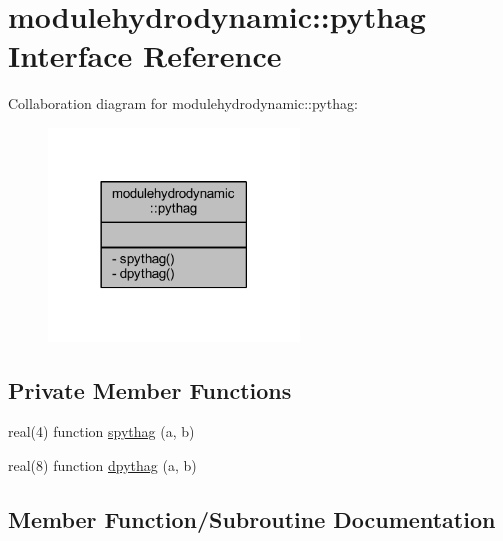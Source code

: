 \hypertarget{interfacemodulehydrodynamic_1_1pythag}{}\section{modulehydrodynamic\+:\+:pythag Interface Reference}
\label{interfacemodulehydrodynamic_1_1pythag}


Collaboration diagram for modulehydrodynamic\+:\+:pythag\+:\nopagebreak
\begin{figure}[H]
\begin{center}
\leavevmode
\includegraphics[width=189pt]{interfacemodulehydrodynamic_1_1pythag__coll__graph}
\end{center}
\end{figure}
\subsection*{Private Member Functions}
\begin{DoxyCompactItemize}
\item 
real(4) function \mbox{\hyperlink{interfacemodulehydrodynamic_1_1pythag_a6a7341d8ee4c8f554db5092851c9f642}{spythag}} (a, b)
\item 
real(8) function \mbox{\hyperlink{interfacemodulehydrodynamic_1_1pythag_ae6c4bd6dbc46dbe0e35283182166380f}{dpythag}} (a, b)
\end{DoxyCompactItemize}


\subsection{Member Function/\+Subroutine Documentation}
\mbox{\label{interfacemodulehydrodynamic_1_1pythag_ae6c4bd6dbc46dbe0e35283182166380f}} 
